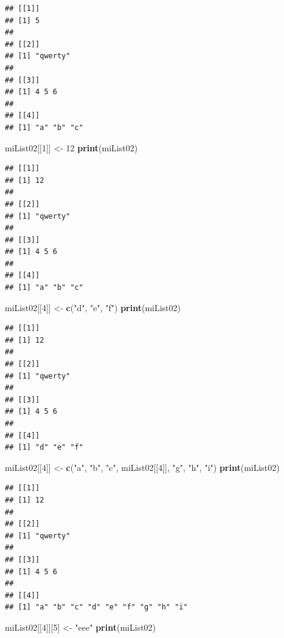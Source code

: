 \documentclass[twoside,symmetric]{book}
\newenvironment{Shaded}{}{}
\newcommand{\DecValTok}[1]{#1}
\newcommand{\KeywordTok}[1]{\textbf{#1}}
\newcommand{\NormalTok}[1]{#1}
\newcommand{\StringTok}[1]{#1}
\begin{document}
\begin{verbatim}
## [[1]]
## [1] 5
## 
## [[2]]
## [1] "qwerty"
## 
## [[3]]
## [1] 4 5 6
## 
## [[4]]
## [1] "a" "b" "c"
\end{verbatim}

\begin{Shaded}
\begin{Highlighting}[]
\NormalTok{miList02[[}\DecValTok{1}\NormalTok{]] <-}\StringTok{ }\DecValTok{12}
\KeywordTok{print}\NormalTok{(miList02)}
\end{Highlighting}
\end{Shaded}

\begin{verbatim}
## [[1]]
## [1] 12
## 
## [[2]]
## [1] "qwerty"
## 
## [[3]]
## [1] 4 5 6
## 
## [[4]]
## [1] "a" "b" "c"
\end{verbatim}

\begin{Shaded}
\begin{Highlighting}[]
\NormalTok{miList02[[}\DecValTok{4}\NormalTok{]] <-}\StringTok{ }\KeywordTok{c}\NormalTok{(}\StringTok{"d"}\NormalTok{, }\StringTok{"e"}\NormalTok{, }\StringTok{"f"}\NormalTok{)}
\KeywordTok{print}\NormalTok{(miList02)}
\end{Highlighting}
\end{Shaded}

\begin{verbatim}
## [[1]]
## [1] 12
## 
## [[2]]
## [1] "qwerty"
## 
## [[3]]
## [1] 4 5 6
## 
## [[4]]
## [1] "d" "e" "f"
\end{verbatim}

\begin{Shaded}
\begin{Highlighting}[]
\NormalTok{miList02[[}\DecValTok{4}\NormalTok{]] <-}\StringTok{ }\KeywordTok{c}\NormalTok{(}\StringTok{"a"}\NormalTok{, }\StringTok{"b"}\NormalTok{, }\StringTok{"c"}\NormalTok{, miList02[[}\DecValTok{4}\NormalTok{]], }\StringTok{"g"}\NormalTok{, }\StringTok{"h"}\NormalTok{, }\StringTok{"i"}\NormalTok{)}
\KeywordTok{print}\NormalTok{(miList02)}
\end{Highlighting}
\end{Shaded}

\begin{verbatim}
## [[1]]
## [1] 12
## 
## [[2]]
## [1] "qwerty"
## 
## [[3]]
## [1] 4 5 6
## 
## [[4]]
## [1] "a" "b" "c" "d" "e" "f" "g" "h" "i"
\end{verbatim}

\begin{Shaded}
\begin{Highlighting}[]
\NormalTok{miList02[[}\DecValTok{4}\NormalTok{]][}\DecValTok{5}\NormalTok{] <-}\StringTok{ "eee"}
\KeywordTok{print}\NormalTok{(miList02)}
\end{Highlighting}
\end{Shaded}
\end{document}
